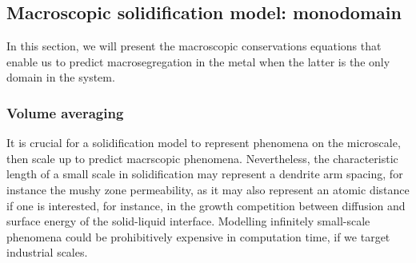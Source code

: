 \subsection{Macroscopic solidification model: monodomain} \label{sec:monodomain}
In this section, we will present the macroscopic conservations equations that enable us to predict 
macrosegregation in the metal when the latter is the only domain in the system.
%
\subsubsection{Volume averaging} \label{sec:volumeavg}
It is crucial for a solidification model to represent phenomena on the microscale, then scale up to predict 
macrscopic phenomena. Nevertheless, the characteristic length of a small scale in solidification may represent a dendrite arm spacing, for instance the mushy zone permeability, as it may also represent an atomic distance if one is interested, for instance, in the growth competition between diffusion and surface energy of the solid-liquid interface. Modelling infinitely small-scale phenomena could be prohibitively expensive in computation time, if we target industrial scales. 

